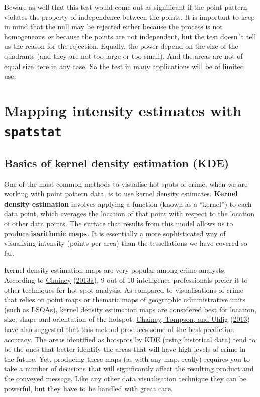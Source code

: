 \documentclass[
  krantz2]{krantz}
\begin{document}
Beware as well that this test would come out as significant if the point pattern violates the property of independence between the points. It is important to keep in mind that the null may be rejected either because the process is not homogeneous \emph{or} because the points are not independent, but the test doesn´t tell us the reason for the rejection. Equally, the power depend on the size of the quadrants (and they are not too large or too small). And the areas are not of equal size here in any case. So the test in many applications will be of limited use.

\hypertarget{mapping-intensity-estimates-with-spatstat}{%
\section{\texorpdfstring{Mapping intensity estimates with \texttt{spatstat}}{Mapping intensity estimates with spatstat}}\label{mapping-intensity-estimates-with-spatstat}}

\hypertarget{basics-of-kernel-density-estimation-kde}{%
\subsection{Basics of kernel density estimation (KDE)}\label{basics-of-kernel-density-estimation-kde}}

One of the most common methods to visualise hot spots of crime, when we are working with point pattern data, is to use kernel density estimates. \textbf{Kernel density estimation} involves applying a function (known as a ``kernel'') to each data point, which averages the location of that point with respect to the location of other data points. The surface that results from this model allows us to produce \textbf{isarithmic maps}. It is essentially a more sophisticated way of visualising intensity (points per area) than the tessellations we have covered so far.

Kernel density estimation maps are very popular among crime analysts. According to \protect\hyperlink{ref-Chainey_2013a}{Chainey} (\protect\hyperlink{ref-Chainey_2013a}{2013a}), 9 out of 10 intelligence professionals prefer it to other techniques for hot spot analysis. As compared to visualisations of crime that relies on point maps or thematic maps of geographic administrative units (such as LSOAs), kernel density estimation maps are considered best for location, size, shape and orientation of the hotspot. \protect\hyperlink{ref-Chainey_2008}{Chainey, Tompson, and Uhlig} (\protect\hyperlink{ref-Chainey_2008}{2013}) have also suggested that this method produces some of the best prediction accuracy. The areas identified as hotspots by KDE (using historical data) tend to be the ones that better identify the areas that will have high levels of crime in the future. Yet, producing these maps (as with any map, really) requires you to take a number of decisions that will significantly affect the resulting product and the conveyed message. Like any other data visualisation technique they can be powerful, but they have to be handled with great care.
\end{document}
